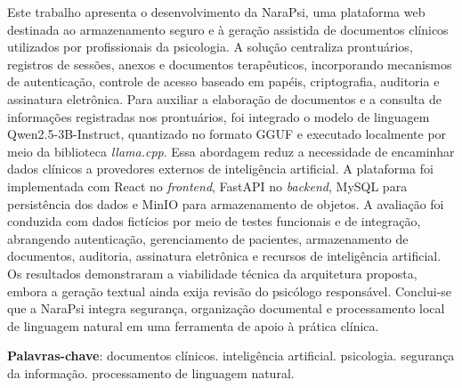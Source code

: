 \begin{resumo}
\noindent

Este trabalho apresenta o desenvolvimento da NaraPsi, uma plataforma web destinada ao armazenamento seguro e à geração assistida de documentos clínicos utilizados por profissionais da psicologia. A solução centraliza prontuários, registros de sessões, anexos e documentos terapêuticos, incorporando mecanismos de autenticação, controle de acesso baseado em papéis, criptografia, auditoria e assinatura eletrônica. Para auxiliar a elaboração de documentos e a consulta de informações registradas nos prontuários, foi integrado o modelo de linguagem Qwen2.5-3B-Instruct, quantizado no formato GGUF e executado localmente por meio da biblioteca \textit{llama.cpp}. Essa abordagem reduz a necessidade de encaminhar dados clínicos a provedores externos de inteligência artificial. A plataforma foi implementada com React no \textit{frontend}, FastAPI no \textit{backend}, MySQL para persistência dos dados e MinIO para armazenamento de objetos. A avaliação foi conduzida com dados fictícios por meio de testes funcionais e de integração, abrangendo autenticação, gerenciamento de pacientes, armazenamento de documentos, auditoria, assinatura eletrônica e recursos de inteligência artificial. Os resultados demonstraram a viabilidade técnica da arquitetura proposta, embora a geração textual ainda exija revisão do psicólogo responsável. Conclui-se que a NaraPsi integra segurança, organização documental e processamento local de linguagem natural em uma ferramenta de apoio à prática clínica.

 \vspace{0.2cm}
\textbf{Palavras-chave}: documentos clínicos. inteligência artificial. psicologia. segurança da informação. processamento de linguagem natural.
 
\end{resumo}
 
